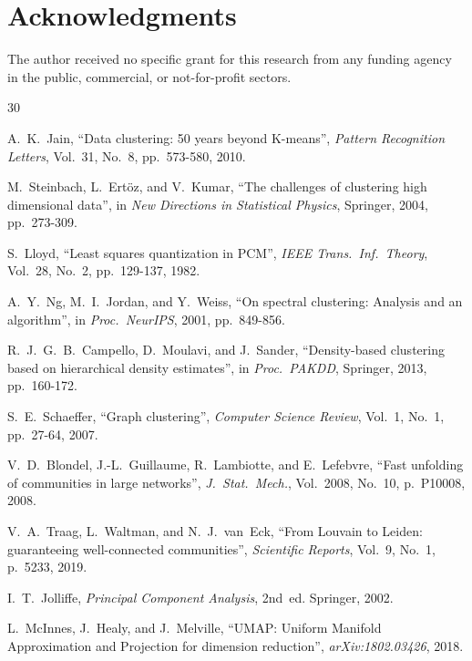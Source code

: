\documentclass[journal]{IEEEtran}
\begin{document}
\section*{Acknowledgments}
\noindent The author received no specific grant for this research from any funding agency in the public, commercial, or not-for-profit sectors.

\begin{thebibliography}{30}

A.~K.~Jain, ``Data clustering: 50 years beyond K-means'', \emph{Pattern Recognition Letters}, Vol.~31, No.~8, pp.~573-580, 2010.

M.~Steinbach, L.~Ert\"{o}z, and V.~Kumar, ``The challenges of clustering high dimensional data'', in \emph{New Directions in Statistical Physics}, Springer, 2004, pp.~273-309.

S.~Lloyd, ``Least squares quantization in PCM'', \emph{IEEE Trans.\ Inf.\ Theory}, Vol.~28, No.~2, pp.~129-137, 1982.

A.~Y.~Ng, M.~I.~Jordan, and Y.~Weiss, ``On spectral clustering: Analysis and an algorithm'', in \emph{Proc.\ NeurIPS}, 2001, pp.~849-856.

R.~J.~G.~B.~Campello, D.~Moulavi, and J.~Sander, ``Density-based clustering based on hierarchical density estimates'', in \emph{Proc.\ PAKDD}, Springer, 2013, pp.~160-172.

S.~E.~Schaeffer, ``Graph clustering'', \emph{Computer Science Review}, Vol.~1, No.~1, pp.~27-64, 2007.

V.~D.~Blondel, J.-L.~Guillaume, R.~Lambiotte, and E.~Lefebvre, ``Fast unfolding of communities in large networks'', \emph{J.\ Stat.\ Mech.}, Vol.~2008, No.~10, p.~P10008, 2008.

V.~A.~Traag, L.~Waltman, and N.~J.~van~Eck, ``From Louvain to Leiden: guaranteeing well-connected communities'', \emph{Scientific Reports}, Vol.~9, No.~1, p.~5233, 2019.

I.~T.~Jolliffe, \emph{Principal Component Analysis}, 2nd~ed. Springer, 2002.

L.~McInnes, J.~Healy, and J.~Melville, ``UMAP: Uniform Manifold Approximation and Projection for dimension reduction'', \emph{arXiv:1802.03426}, 2018.


\end{thebibliography}
\end{document}
